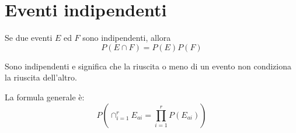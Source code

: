 \section{Eventi indipendenti}

Se due eventi $E$ ed $F$ sono indipendenti, allora
\begin{equation}
    P(E\cap F) = P(E)P(F) 
\end{equation}

Sono indipendenti e significa che la riuscita o meno di un evento non condiziona la riuscita dell'altro. 

La formula generale \`{e}:
\begin{equation}
    P(\cap_{i = 1}^r E_{ai} = \prod_{i = 1}^{r} P(E_{ai})) 
\end{equation}
